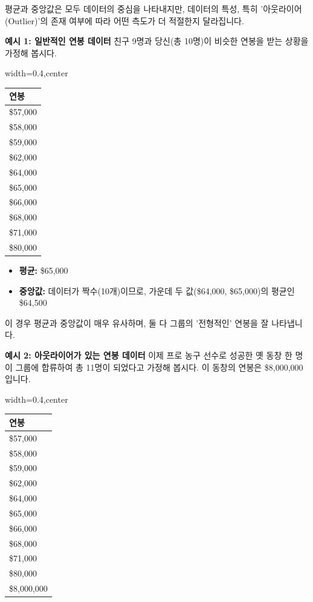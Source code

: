 \documentclass[11pt,a4paper]{article}
\begin{document}
\begin{tcolorbox}[mybox={어떤 중심 경향성 측도를 사용할 것인가? (평균 vs. 중앙값)}]
평균과 중앙값은 모두 데이터의 중심을 나타내지만, 데이터의 특성, 특히 '아웃라이어(Outlier)'의 존재 여부에 따라 어떤 측도가 더 적절한지 달라집니다.

\textbf{예시 1: 일반적인 연봉 데이터}
친구 9명과 당신(총 10명)이 비슷한 연봉을 받는 상황을 가정해 봅시다.
\begin{adjustbox}{width=0.4\textwidth,center}
\begin{tabular}{l}
\toprule
\textbf{연봉} \\
\midrule
\$57,000 \\
\$58,000 \\
\$59,000 \\
\$62,000 \\
\$64,000 \\
\$65,000 \\
\$66,000 \\
\$68,000 \\
\$71,000 \\
\$80,000 \\
\bottomrule
\end{tabular}
\end{adjustbox}
\label{tab:salary_example1}

\begin{itemize}
    \item \textbf{평균:} \$65,000
    \item \textbf{중앙값:} 데이터가 짝수(10개)이므로, 가운데 두 값(\$64,000, \$65,000)의 평균인 \$64,500
\end{itemize}
이 경우 평균과 중앙값이 매우 유사하며, 둘 다 그룹의 '전형적인' 연봉을 잘 나타냅니다.

\textbf{예시 2: 아웃라이어가 있는 연봉 데이터}
이제 프로 농구 선수로 성공한 옛 동창 한 명이 그룹에 합류하여 총 11명이 되었다고 가정해 봅시다. 이 동창의 연봉은 \$8,000,000입니다.
\begin{adjustbox}{width=0.4\textwidth,center}
\begin{tabular}{l}
\toprule
\textbf{연봉} \\
\midrule
\$57,000 \\
\$58,000 \\
\$59,000 \\
\$62,000 \\
\$64,000 \\
\$65,000 \\
\$66,000 \\
\$68,000 \\
\$71,000 \\
\$80,000 \\
\$8,000,000 \\
\bottomrule
\end{tabular}
\end{adjustbox}
\label{tab:salary_example2}


\end{tcolorbox}
\end{document}
